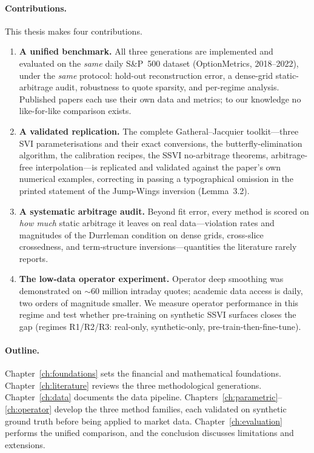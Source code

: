 \paragraph{Contributions.} This thesis makes four contributions.
\begin{enumerate}
  \item \textbf{A unified benchmark.} All three generations are implemented and evaluated on the \emph{same} daily S\&P~500 dataset (OptionMetrics, 2018--2022), under the \emph{same} protocol: hold-out reconstruction error, a dense-grid static-arbitrage audit, robustness to quote sparsity, and per-regime analysis. Published papers each use their own data and metrics; to our knowledge no like-for-like comparison exists.
  \item \textbf{A validated replication.} The complete Gatheral--Jacquier toolkit---three SVI parameterisations and their exact conversions, the butterfly-elimination algorithm, the calibration recipes, the SSVI no-arbitrage theorems, arbitrage-free interpolation---is replicated and validated against the paper's own numerical examples, correcting in passing a typographical omission in the printed statement of the Jump-Wings inversion (Lemma~3.2).
  \item \textbf{A systematic arbitrage audit.} Beyond fit error, every method is scored on \emph{how much} static arbitrage it leaves on real data---violation rates and magnitudes of the Durrleman condition on dense grids, cross-slice crossedness, and term-structure inversions---quantities the literature rarely reports.
  \item \textbf{The low-data operator experiment.} Operator deep smoothing was demonstrated on $\sim$60 million intraday quotes; academic data access is daily, two orders of magnitude smaller. We measure operator performance in this regime and test whether pre-training on synthetic SSVI surfaces closes the gap (regimes R1/R2/R3: real-only, synthetic-only, pre-train-then-fine-tune).
\end{enumerate}

\paragraph{Outline.} Chapter~\ref{ch:foundations} sets the financial and mathematical foundations. Chapter~\ref{ch:literature} reviews the three methodological generations. Chapter~\ref{ch:data} documents the data pipeline. Chapters~\ref{ch:parametric}--\ref{ch:operator} develop the three method families, each validated on synthetic ground truth before being applied to market data. Chapter~\ref{ch:evaluation} performs the unified comparison, and the conclusion discusses limitations and extensions.
